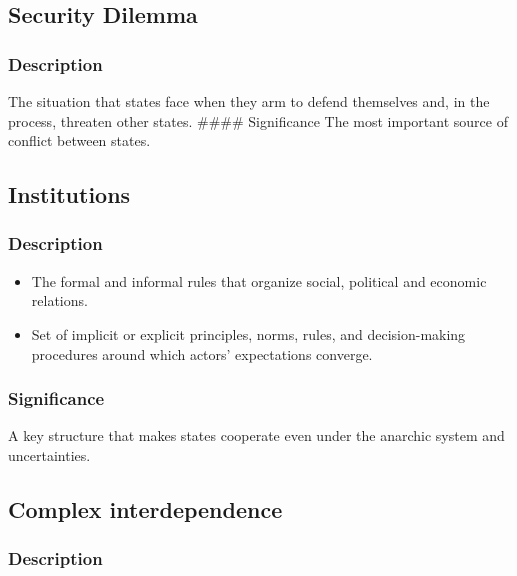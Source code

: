 \documentclass[
]{book}
\begin{document}
\hypertarget{security-dilemma}{%
\subsection{Security Dilemma}\label{security-dilemma}}

\hypertarget{description-6}{%
\subsubsection{Description}\label{description-6}}

The situation that states face when they arm to defend themselves and, in the process, threaten other states.
\#\#\#\# Significance
The most important source of conflict between states.

\hypertarget{institutions}{%
\subsection{Institutions}\label{institutions}}

\hypertarget{description-7}{%
\subsubsection{Description}\label{description-7}}

\begin{itemize}
\item
  The formal and informal rules that organize social, political and economic relations.
\item
  Set of implicit or explicit principles, norms, rules, and decision-making procedures around which actors' expectations converge.
\end{itemize}

\hypertarget{significance-7}{%
\subsubsection{Significance}\label{significance-7}}

A key structure that makes states cooperate even under the anarchic system and uncertainties.

\hypertarget{complex-interdependence}{%
\subsection{Complex interdependence}\label{complex-interdependence}}

\hypertarget{description-8}{%
\subsubsection{Description}\label{description-8}}
\end{document}
